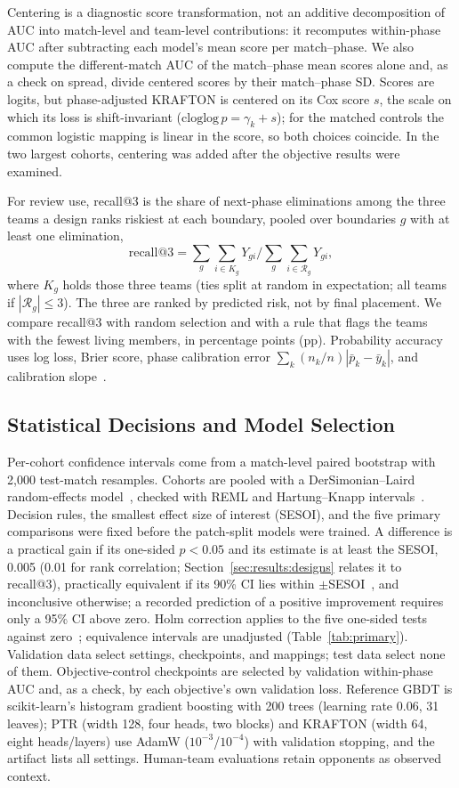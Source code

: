 \documentclass[sigconf,anonymous]{acmart}
\begin{document}
Centering is a diagnostic score transformation, not an additive decomposition of AUC into match-level and team-level contributions: it recomputes within-phase AUC after subtracting each model's mean score per match--phase. We also compute the different-match AUC of the match--phase mean scores alone and, as a check on spread, divide centered scores by their match--phase SD. Scores are logits, but phase-adjusted KRAFTON is centered on its Cox score $s$, the scale on which its loss is shift-invariant ($\mathrm{cloglog}\,p=\gamma_k+s$); for the matched controls the common logistic mapping is linear in the score, so both choices coincide. In the two largest cohorts, centering was added after the objective results were examined.

For review use, recall@3 is the share of next-phase eliminations among the three teams a design ranks riskiest at each boundary, pooled over boundaries $g$ with at least one elimination,
\[
\mathrm{recall@3}=\sum_g\sum_{i\in K_g}Y_{gi}\Big/\sum_g\sum_{i\in\mathcal{R}_g}Y_{gi},
\]
where $K_g$ holds those three teams (ties split at random in expectation; all teams if $|\mathcal{R}_g|\le3$). The three are ranked by predicted risk, not by final placement. We compare recall@3 with random selection and with a rule that flags the teams with the fewest living members, in percentage points (pp). Probability accuracy uses log loss, Brier score, phase calibration error $\sum_k(n_k/n)|\bar p_k-\bar y_k|$, and calibration slope~\cite{VanCalster16}.

\subsection{Statistical Decisions and Model Selection}
Per-cohort confidence intervals come from a match-level paired bootstrap with 2,000 test-match resamples.
Cohorts are pooled with a DerSimonian--Laird random-effects model~\cite{DerSimonian86}, checked with REML and Hartung--Knapp intervals~\cite{HartungKnapp01}.
Decision rules, the smallest effect size of interest (SESOI), and the five primary comparisons were fixed before the patch-split models were trained. A difference is a practical gain if its one-sided $p<0.05$ and its estimate is at least the SESOI, 0.005 (0.01 for rank correlation; Section~\ref{sec:results:designs} relates it to recall@3), practically equivalent if its 90\% CI lies within $\pm$SESOI~\cite{Schuirmann87}, and inconclusive otherwise; a recorded prediction of a positive improvement requires only a 95\% CI above zero.
Holm correction applies to the five one-sided tests against zero~\cite{Holm79}; equivalence intervals are unadjusted (Table~\ref{tab:primary}).
Validation data select settings, checkpoints, and mappings; test data select none of them. Objective-control checkpoints are selected by validation within-phase AUC and, as a check, by each objective's own validation loss. Reference GBDT is scikit-learn's histogram gradient boosting with 200 trees (learning rate 0.06, 31 leaves); PTR (width 128, four heads, two blocks) and KRAFTON (width 64, eight heads/layers) use AdamW ($10^{-3}$/$10^{-4}$) with validation stopping, and the artifact lists all settings. Human-team evaluations retain opponents as observed context.
\end{document}
